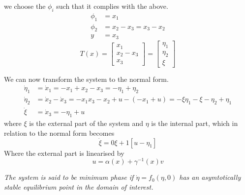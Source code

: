 we choose the $\phi_i$ such that it complies with the above.
\begin{equation}
        \begin{split}
                \phi_1 &= x_1 \\
                \phi_2 &= x_2 - x_3 = x_3 - x_2 \\
                y &= x_3
        \end{split}
\end{equation}
\begin{equation}
        T(x) = 
        \begin{bmatrix}
                x_1 \\
                x_2 - x_3 \\
                x_3
        \end{bmatrix}
        =
        \begin{bmatrix}
                \eta_1 \\
                \eta_2 \\
                \xi
        \end{bmatrix}
\end{equation}

We can now transform the system to the normal form.
\begin{equation}
        \begin{split}
        \dot{\eta}_{1} &= \dot{x}_{1} = -x_1 + x_2 - x_3 = -\eta_1 + \eta_2 \\
        \dot{\eta}_2 &= \dot{x}_2 - \dot{x}_3 = -x_1 x_3 - x_2 + u - (-x_1 + u) = -\xi \eta_1 - \xi - \eta_2 + \eta_1 \\
        \dot{\xi} &= \dot{x}_3 = -\eta_1 + u
        \end{split}
\end{equation}
where $\xi$ is the external part of the system and $\eta$ is the internal part, which in relation to the normal form
becomes 
\begin{equation}
        \dot{\xi} = 0\xi + 1\left[u - \eta_1\right]
\end{equation}
Where the external part is linearised by
\begin{equation}
        u = \alpha(x) + \gamma^{-1} (x) v
\end{equation}

\textit{The system is said to be minimum phase if $\dot{\eta} = f_0(\eta,0)$ has an asymtotically stable equilibrium
  point in the domain of interest.} 

